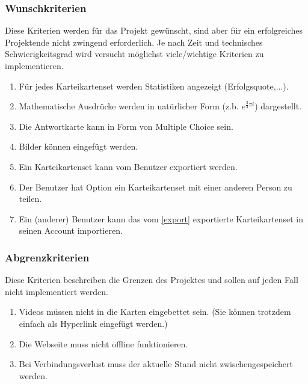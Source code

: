 \subsubsection{Wunschkriterien}
Diese Kriterien werden für das Projekt gewünscht, sind aber für ein erfolgreiches Projektende nicht zwingend erforderlich. Je nach Zeit und technisches Schwierigkeitsgrad wird versucht möglichst viele/wichtige Kriterien zu implementieren.

\begin{enumerate}[leftmargin=2cm, label=\bfseries /WK\arabic*0/]
	\item Für jedes Karteikartenset werden Statistiken angezeigt (Erfolgsquote,...).
	\item Mathematische Ausdrücke werden in natürlicher Form (z.b. \( e^{\frac{3}{4}\pi i}\)) dargestellt.
	\item Die Antwortkarte kann in Form von Multiple Choice sein.
	\item Bilder können eingefügt werden.
	\item\label{export} Ein Karteikartenset kann vom Benutzer exportiert werden.
	\item\label{share} Der Benutzer hat Option ein Karteikartenset mit einer anderen Person zu teilen.
	\item Ein (anderer) Benutzer kann das vom \ref{export} exportierte Karteikartenset in seinen Account importieren.
\end{enumerate}

\subsubsection{Abgrenzkriterien}
Diese Kriterien beschreiben die Grenzen des Projektes und sollen auf jeden Fall nicht implementiert werden.

\begin{enumerate}[leftmargin=2cm, label=\bfseries /AK\arabic*0/]
	\item Videos müssen nicht in die Karten eingebettet sein. (Sie können trotzdem einfach als Hyperlink eingefügt werden.)
	\item Die Webseite muss nicht offline funktionieren.
	\item Bei Verbindungsverlust muss der aktuelle Stand nicht zwischengespeichert werden.
\end{enumerate}



